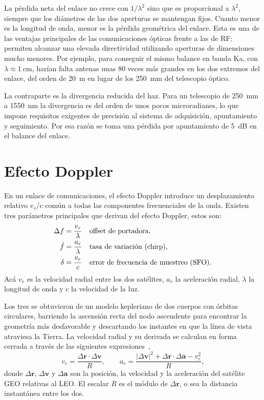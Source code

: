 La p\'erdida neta del enlace no crece con $1/\lambda^{2}$ sino que es
proporcional a $\lambda^{2}$, siempre que los di\'ametros de las dos aperturas
se mantengan fijos. Cuanto menor es la longitud de onda, menor es la
p\'erdida geom\'etrica del enlace. Esta es una de las ventajas principales de
las comunicaciones \'opticas frente a las de RF: permiten alcanzar una elevada directividad utilizando aperturas de dimensiones mucho menores. Por ejemplo, para conseguir el mismo
balance en banda Ka, con $\lambda\approx\SI{1}{\centi\metre}$, har\'ian falta
antenas unas \num{80} veces m\'as grandes en los dos extremos del enlace, del
orden de \SI{20}{\metre} en lugar de los \SI{250}{\milli\metre} del telescopio
\'optico.

La contraparte es la divergencia reducida del haz. Para un telescopio de
\SI{250}{\milli\metre} a \SI{1550}{\nano\metre} la divergencia es del orden de unos pocos
microradianes, lo que impone requisitos exigentes de precisi\'on al sistema de
adquisici\'on, apuntamiento y seguimiento. Por esa raz\'on se toma una
p\'erdida por apuntamiento de \SI{5}{\dB} en el balance del enlace.

\section{Efecto Doppler}
\label{sec:canal-doppler}

En un enlace de comunicaciones, el efecto Doppler introduce un desplazamiento
relativo $v_r/c$ com\'un a todas las componentes frecuenciales de la onda. Existen tres par\'ametros principales que derivan del efecto Doppler, estos son:
\begin{align}
  \Delta f    &= \frac{v_r}{\lambda}  &&\text{offset de portadora,}
           \label{eq:dop-offset}\\
  \dot{f}  &= \frac{a_r}{\lambda}  &&\text{tasa de variaci\'on (chirp),}
           \label{eq:dop-chirp}\\
  \delta &= \frac{v_r}{c}        &&\text{error de frecuencia de muestreo (SFO).}
           \label{eq:dop-sfo}
\end{align}
Ac\'a $v_r$ es la velocidad radial entre los dos sat\'elites, $a_r$ la
aceleraci\'on radial, $\lambda$ la longitud de onda y $c$ la velocidad de la
luz.

Los tres se obtuvieron de un modelo kepleriano de dos cuerpos con \'orbitas
circulares, barriendo la ascensi\'on recta del nodo ascendente para encontrar
la geometr\'ia m\'as desfavorable y descartando los instantes en que la l\'inea
de vista atraviesa la Tierra. La velocidad radial y su derivada se calculan en
forma cerrada a trav\'es de las siguientes expresiones~\cite{vallado2013},
\begin{equation}
  v_r = \frac{\Delta\mathbf{r}\cdot\Delta\mathbf{v}}{R},
  \qquad
  a_r = \frac{\lvert\Delta\mathbf{v}\rvert^{2}
             + \Delta\mathbf{r}\cdot\Delta\mathbf{a} - v_r^{2}}{R},
  \label{eq:rangerate}
\end{equation}
donde $\Delta\mathbf{r}$, $\Delta\mathbf{v}$ y $\Delta\mathbf{a}$ son la
posici\'on, la velocidad y la aceleraci\'on del sat\'elite GEO relativas al
LEO. El escalar $R$ es el m\'odulo de $\Delta\mathbf{r}$, o sea la distancia
instant\'anea entre los dos. 

